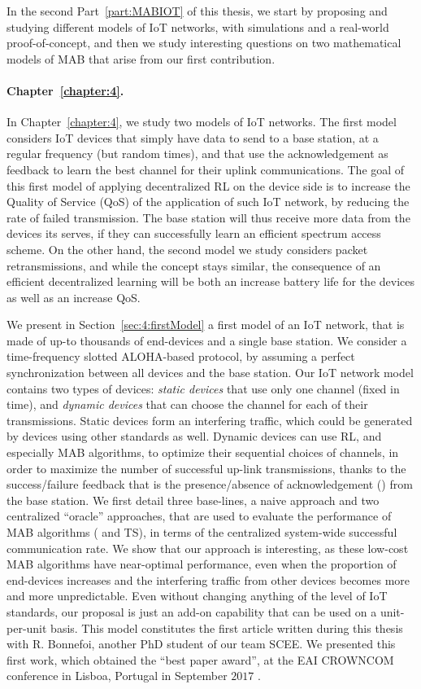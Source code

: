 In the second Part~\ref{part:MABIOT} of this thesis, we start by proposing and studying different models of IoT networks, with simulations and a real-world proof-of-concept, and then we study interesting questions on two mathematical models of MAB that arise from our first contribution.


\paragraph{Chapter~\ref{chapter:4}.}
%
In Chapter~\ref{chapter:4}, we study two models of IoT networks.
The first model considers IoT devices that simply have data to send to a base station, at a regular frequency (but random times), and that use the acknowledgement as feedback to learn the best channel for their uplink communications.
The goal of this first model of applying decentralized RL on the device side is to increase the Quality of Service (QoS) of the application of such IoT network, by reducing the rate of failed transmission. The base station will thus receive more data from the devices its serves, if they can successfully learn an efficient spectrum access scheme.
%
On the other hand, the second model we study considers packet retransmissions, and while the concept stays similar, the consequence of an efficient decentralized learning will be both an increase battery life for the devices as well as an increase QoS.

We present in Section~\ref{sec:4:firstModel} a first model of an IoT network, that is made of up-to thousands of end-devices and a single base station.
We consider a time-frequency slotted ALOHA-based protocol, by assuming a perfect synchronization between all devices and the base station.
%
Our IoT network model contains two types of devices: \emph{static devices} that use only one channel (fixed in time), and \emph{dynamic devices} that can choose the channel for each of their transmissions.
Static devices form an interfering traffic, which could be generated by devices using other standards as well.
Dynamic devices can use RL, and especially MAB algorithms, to optimize their sequential choices of channels, in order to maximize the number of successful up-link transmissions, thanks to the success/failure feedback that is the presence/absence of acknowledgement (\Ack) from the base station.
%
We first detail three base-lines, a naive approach and two centralized ``oracle'' approaches,
that are used to evaluate the performance of MAB algorithms (\UCB{} and TS), in terms of the centralized system-wide successful communication rate.
We show that our approach is interesting, as these low-cost MAB algorithms have near-optimal performance, even when the proportion of end-devices increases and the interfering traffic from other devices becomes more and more unpredictable.
%
Even without changing anything of the level of IoT standards, our proposal is just an add-on capability that can be used on a unit-per-unit basis.
This model constitutes the first article written during this thesis with R. Bonnefoi, another PhD student of our team SCEE.
We presented this first work, which obtained the ``best paper award'', at the EAI CROWNCOM conference in Lisboa, Portugal in September $2017$ \cite{Bonnefoi17}.

